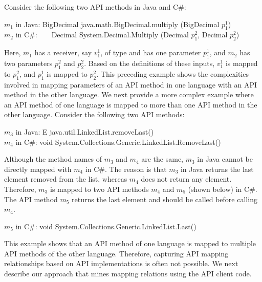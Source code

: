 Consider the following two API methods in Java and C\#:

\begin{CodeOut}
$m_1$ in Java: BigDecimal java.math.BigDecimal.multiply (BigDecimal $p_1^1$)\\
\hspace*{0.12in}$m_2$ in C\#:\ \ \ \  Decimal
System.Decimal.Multiply (Decimal $p_1^2$, Decimal $p_2^2$)
\end{CodeOut}

Here, $m_1$ has a receiver, say $v_1^1$, of type 
and has one parameter $p_1^1$, and $m_2$ has two parameters $p_1^2$
and $p_2^2$. Based on the definitions of these inputs, $v_1^1$ is
mapped to $p_1^2$, and $p_1^1$ is mapped to $p_2^2$. This preceding
example shows the complexities involved in mapping parameters of an API
method in one language with an API method in the other language. 
We next provide a more complex example where an API method of one 
language is mapped to more than one API method in the other language. Consider the following two API methods:

\begin{CodeOut}
$m_3$ in Java: E java.util.LinkedList.removeLast()\\
\hspace*{0.12in}$m_4$ in C\#: void System.Collections.Generic.LinkedList.RemoveLast()
\end{CodeOut}

Although the method names of $m_3$ and $m_4$ are the same, $m_3$ in Java
cannot be directly mapped with $m_4$ in C\#. The reason is that $m_3$ in Java
returns the last element removed from the list, whereas $m_4$ does not return any
element. Therefore, $m_3$ is mapped to two API methods $m_4$ and $m_5$ (shown below) in C\#.
The API method $m_5$ returns the last element and should be called before calling $m_4$.

\begin{CodeOut}
$m_5$ in C\#: void System.Collections.Generic.LinkedList.Last()
\end{CodeOut}

This example shows that an API method of one language is mapped
to multiple API methods of the other language. Therefore, capturing API mapping relationships
based on API implementations is often not possible. We next describe our approach
that mines mapping relations using the API client code.

